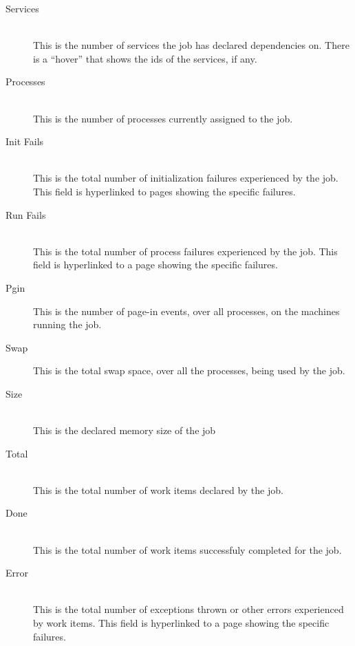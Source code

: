 \begin{description}
            \item[Services] \hfill \\
              This is the number of services the job has declared dependencies on.  There is a ``hover'' that
              shows the ids of the services, if any.

            \item[Processes] \hfill \\
              This is the number of processes currently assigned to the job.

            \item[Init Fails] \hfill \\
              This is the total number of initialization failures experienced by the job. This
              field is hyperlinked to pages showing the specific failures.
              
            \item[Run Fails] \hfill \\
              This is the total number of process failures experienced by the job. This field is
              hyperlinked to a page showing the specific failures.
              
            \item[Pgin] This is the number of page-in events, over all processes, on the machines
              running the job.

            \item[Swap] This is the total swap space, over all the processes, being used by the job.

            \item[Size] \hfill \\
              This is the declared memory size of the job
              
            \item[Total] \hfill \\
              This is the total number of work items declared by the job.
              
            \item[Done] \hfill \\
              This is the total number of work items successfuly completed for the job.
              
            \item[Error] \hfill \\
              This is the total number of exceptions thrown or other errors experienced by work
              items. This field is hyperlinked to a page showing the specific failures.
              

\end{description}
